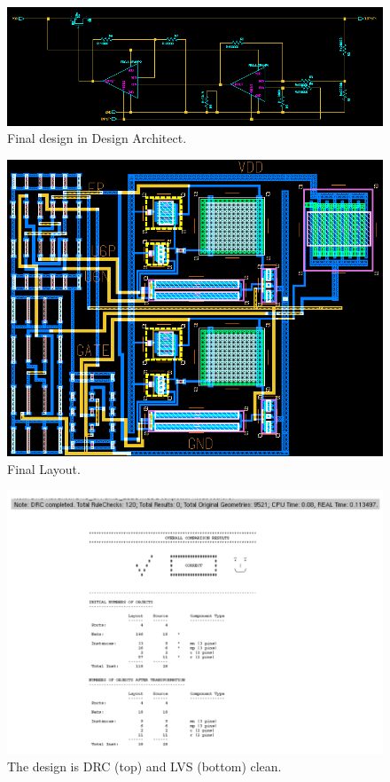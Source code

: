 \documentclass[10pt]{amsart}
\begin{document}
\begin{figure}[H]
	\begin{center}
		\includegraphics[width=5in]{Media/schem.png}
	\end{center}
	\caption{Final design in Design Architect.}
	\label{fig:cc}
\end{figure}

\begin{figure}[H]
	\begin{center}
		\includegraphics[width=8in, angle=90]{Media/lay_final.png}
	\end{center}
	\caption{Final Layout.}
	\label{fig:cc}
\end{figure}

\begin{figure}[H]
	\begin{center}
		\includegraphics[width=6in]{Media/checks.png}
	\end{center}
	\caption{The design is DRC (top) and LVS (bottom) clean.}
	\label{fig:cc}
\end{figure}
\end{document}
